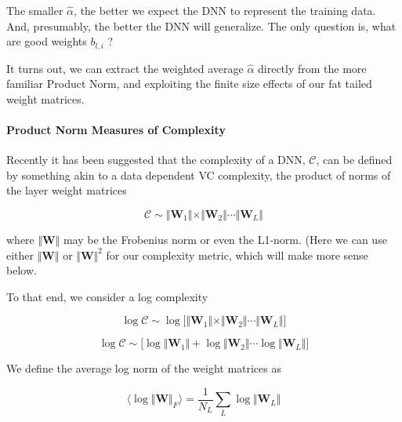 The smaller $\hat{\alpha}$, the better we expect the DNN to represent the training data. And, presumably, the better the DNN will generalize.
The only question is, what are good weights $b_{l,i}$ ?

It turns out, we can extract the weighted average $\hat{\alpha}$ directly from the more familiar Product Norm, and exploiting the finite size effects of our fat tailed weight matrices.



\paragraph{Product Norm Measures of Complexity}

Recently it has been suggested that the complexity of a DNN, $\mathcal{C}$,  can be defined by something akin to a data dependent VC complexity, the product of norms of the layer weight matrices

$$\mathcal{C}\sim\Vert\mathbf{W}_{1}\Vert\times\Vert\mathbf{W}_{2}\Vert\cdots\Vert\mathbf{W}_{L}\Vert$$

where $\Vert\mathbf{W}\Vert$ may be the Frobenius norm or even the L1-norm.  (Here we can use either  $\Vert\mathbf{W}\Vert$ or $\Vert\mathbf{W}\Vert^{2}$ for our complexity metric, which will make more sense below.

To that end, we consider a log complexity

$$\log\mathcal{C}\sim\log\bigg[\Vert\mathbf{W}_{1}\Vert\times\Vert\mathbf{W}_{2}\Vert\cdots\Vert\mathbf{W}_{L}\Vert\bigg]$$

$$\log\mathcal{C}\sim\bigg[\log\Vert\mathbf{W}_{1}\Vert+\log\Vert\mathbf{W}_{2}\Vert\cdots\log\Vert\mathbf{W}_{L}\Vert\bigg]$$

We define the average log norm of the weight matrices as

$$\langle\log\Vert\mathbf{W}\Vert_{F}\rangle=\dfrac{1}{N_{L}}\sum_{L}\log\Vert\mathbf{W}_{L}\Vert$$

